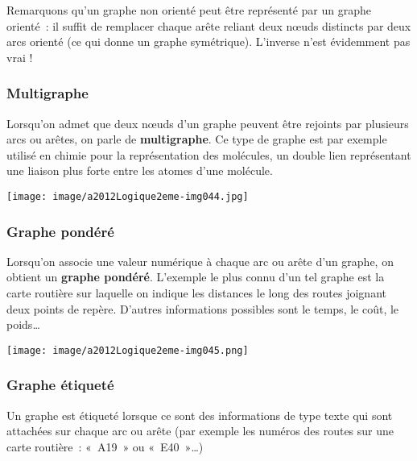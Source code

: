 			Remarquons qu'un graphe non orienté peut être représenté par un 
			graphe orienté~: il suffit de remplacer chaque arête
			reliant deux n{\oe}uds distincts par deux arcs orienté (ce qui donne 
			un graphe symétrique). L'inverse n'est évidemment pas vrai !

		\subsubsection{Multigraphe}
			
			Lorsqu'on admet que deux n{\oe}uds d'un graphe peuvent 
			être rejoints par plusieurs arcs ou arêtes, on parle de
			\textbf{multigraphe}. Ce type de graphe est par exemple 
			utilisé en chimie pour la représentation des molécules, un
			double lien représentant une liaison plus forte entre 
			les atomes d'une molécule.

			\begin{center}
			\texttt{[image: image/a2012Logique2eme-img044.jpg]}
			\end{center}

		\subsubsection{Graphe pondéré}
			
			Lorsqu'on associe une valeur numérique à chaque arc ou 
			arête d'un graphe, on obtient un \textbf{graphe pondéré}.
			L'exemple le plus connu d'un tel graphe est la carte routière 
			sur laquelle on indique les distances le long des routes
			joignant deux points de repère. D'autres informations possibles 
			sont le temps, le coût, le poids{\dots}

			\begin{center}
			\texttt{[image: image/a2012Logique2eme-img045.png]} 
			\end{center}
			
		\subsubsection{Graphe étiqueté}
		
			Un graphe est étiqueté lorsque ce sont des informations 
			de type texte qui sont attachées sur chaque arc ou arête (par
			exemple les numéros des routes sur une carte routière~: «~A19~» ou «~E40~»{\dots})


